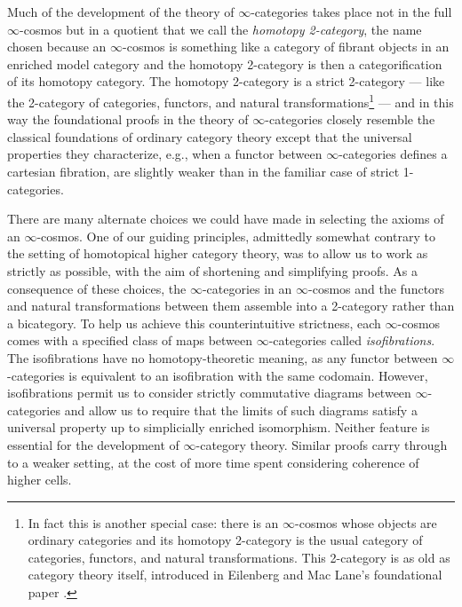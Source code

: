  Much of the development of the theory of $\infty$-categories takes place not in the full $\infty$-cosmos but in a quotient that we call the \emph{homotopy 2-category}, the name chosen because an $\infty$-cosmos is something like a category of fibrant objects in an enriched model category and the homotopy 2-category is then a categorification of its homotopy category. The homotopy 2-category is a strict 2-category --- like the 2-category of categories, functors, and natural transformations\footnote{In fact this is another special case: there is an \texorpdfstring{$\infty$}{infinity}-cosmos whose objects are ordinary categories and its homotopy 2-category is the usual category of categories, functors, and natural transformations. This 2-category is as old as category theory itself, introduced in Eilenberg and Mac Lane's foundational paper \cite{EilenbergMaclane:1945gt}.} --- and in this way the foundational proofs in the theory of $\infty$-categories closely resemble the classical foundations of ordinary category theory except that the universal properties they characterize, e.g., when a functor between $\infty$-categories defines a cartesian fibration, are slightly weaker than in the familiar case of strict 1-categories.

 There are many alternate choices we could have made in selecting the axioms of an $\infty$-cosmos. One of our guiding principles, admittedly somewhat contrary to the setting of homotopical higher category theory, was to allow us to work as strictly as possible, with the aim of shortening and simplifying proofs. As a consequence of these choices, the $\infty$-categories in an $\infty$-cosmos and the functors and natural transformations between them assemble into a 2-category rather than a bicategory. To help us achieve this counterintuitive strictness, each $\infty$-cosmos comes with a specified class of maps between $\infty$-categories called \emph{isofibrations}. The isofibrations have no homotopy-theoretic meaning, as any functor between $\infty$-categories is equivalent to an isofibration with the same codomain. However, isofibrations permit us to consider strictly commutative diagrams between $\infty$-cat\-e\-go\-ries and allow us to require that the limits of such diagrams satisfy a universal property up to simplicially enriched isomorphism. Neither feature is essential for the development of $\infty$-category theory. Similar proofs carry through to a weaker setting, at the cost of more time spent considering coherence of higher cells.

